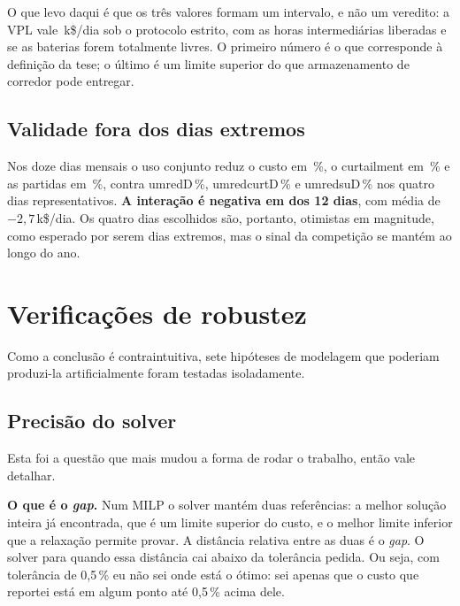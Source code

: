 \documentclass[11pt,a4paper]{article}
\begin{document}
O que levo daqui é que os três valores formam um intervalo, e não um veredito: a VPL vale
\numdBdedic{}\,k\$/dia sob o protocolo estrito, \numdBexplic{} com as horas intermediárias liberadas e
\numdBemerg{} se as baterias forem totalmente livres. O primeiro número é o que corresponde à definição da
tese; o último é um limite superior do que armazenamento de corredor pode entregar.

\subsection{Validade fora dos dias extremos}

\begin{table}[htbp]
\centering\small
\caption{Um dia útil de energia mediana por mês, configuração base (k\$/dia).}
\tabmensais
\end{table}

Nos doze dias mensais o uso conjunto reduz o custo em \nummensalcusto{}\,\%, o curtailment em
\nummensalcurt{}\,\% e as partidas em \nummensalsu{}\,\%, contra 
umredD{}\,\%, 
umredcurtD{}\,\% e 
umredsuD{}\,\% nos quatro dias
representativos. \textbf{A interação é negativa em \nummensalIneg{} dos 12 dias}, com média de
$-2{,}7$\,k\$/dia. Os quatro dias escolhidos são, portanto, otimistas em magnitude, como esperado por serem dias extremos,
mas o sinal da competição se mantém ao longo do ano.

\section{Verificações de robustez}

Como a conclusão é contraintuitiva, sete hipóteses de modelagem que poderiam produzi-la artificialmente
foram testadas isoladamente.

\subsection{Precisão do solver}
\label{sec:gap}

Esta foi a questão que mais mudou a forma de rodar o trabalho, então vale detalhar.

\textbf{O que é o \emph{gap}.} Num MILP o solver mantém duas referências: a melhor solução inteira já
encontrada, que é um limite superior do custo, e o melhor limite inferior que a relaxação permite provar.
A distância relativa entre as duas é o \emph{gap}. O solver para quando essa distância cai abaixo da
tolerância pedida. Ou seja, com tolerância de 0{,}5\,\% eu não sei onde está o ótimo: sei apenas que o
custo que reportei está em algum ponto até 0{,}5\,\% acima dele.
\end{document}
